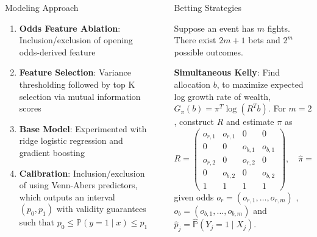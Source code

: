 \documentclass[final]{beamer}
\newlength{\sepwidth}
\newlength{\colwidth}
\newcommand{\separatorcolumn}{\begin{column}{\sepwidth}\end{column}}
\begin{document}
\begin{frame}[t]
\begin{columns}[t]
\begin{column}{\colwidth}
\begin{block}{Modeling Approach}
    \begin{enumerate}
        \item \textbf{Odds Feature Ablation}: Inclusion/exclusion of opening odds-derived feature

        \item \textbf{Feature Selection}: Variance thresholding followed by top K selection via mutual information scores

        \item \textbf{Base Model}: Experimented with ridge logistic regression and gradient boosting

        \item \textbf{Calibration}: Inclusion/exclusion of using Venn-Abers predictors, which outputs an interval $(p_0, p_1)$ with validity guarantees such that
        $p_0 \leq \mathbb{P}(y = 1 \mid x) \leq p_1$
    \end{enumerate}

  \end{block}

\end{column}

\separatorcolumn

\begin{column}{\colwidth}

  \begin{block}{Betting Strategies}

    Suppose an event has $m$ fights. There exist $2m + 1$ bets and $2^m$ possible outcomes.

    \textbf{Simultaneous Kelly}: Find allocation $b$, to maximize expected log growth rate of wealth, $G_{\pi} (b) = \pi^T \log(R^Tb)$. For $m = 2$, construct $R$ and estimate $\pi$ as
    $$R = \begin{pmatrix}
    o_{r, 1} & o_{r, 1} & 0 & 0 \\
    0 & 0 & o_{b, 1} & o_{b, 1} \\
    o_{r, 2} & 0 & o_{r, 2} & 0 \\
    0 & o_{b, 2} & 0 & o_{b, 2} \\
    1 & 1 & 1 & 1
    \end{pmatrix}, \quad \hat{\pi} = \begin{pmatrix}
        \hat{p}_1 \hat{p}_2 \\
        \hat{p}_1 (1 - \hat{p}_2) \\
        (1 - \hat{p}_1) \hat{p}_2 \\
        (1 - \hat{p}_1) (1 - \hat{p}_2)
    \end{pmatrix}$$
    given odds $o_{r} = (o_{r,1}, \ldots, o_{r,m})$ , $o_b = (o_{b,1}, \ldots, o_{b,m})$ and $\hat{p}_j = \hat{\mathbb{P}}(Y_j = 1 \mid X_j)$.


\end{block}
\end{column}
\end{columns}
\end{frame}
\end{document}
